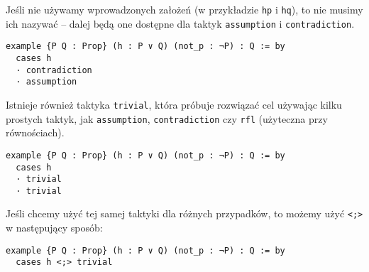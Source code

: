\documentclass[polish,pretty]{angav}
\newcommand{\Lean}[1]{\texttt{#1}}
\begin{document}
Jeśli nie używamy wprowadzonych założeń (w przykładzie \Lean{hp} i \Lean{hq}), to nie musimy ich nazywać -- dalej będą one dostępne dla taktyk \Lean{assumption} i \Lean{contradiction}.
\begin{verbatim}
example {P Q : Prop} (h : P ∨ Q) (not_p : ¬P) : Q := by
  cases h
  · contradiction
  · assumption
\end{verbatim}

Istnieje również taktyka \Lean{trivial}, która próbuje rozwiązać cel używając kilku prostych taktyk, jak \Lean{assumption}, \Lean{contradiction} czy \Lean{rfl} (użyteczna przy równościach).
\begin{verbatim}
example {P Q : Prop} (h : P ∨ Q) (not_p : ¬P) : Q := by
  cases h
  · trivial
  · trivial
\end{verbatim}

Jeśli chcemy użyć tej samej taktyki dla różnych przypadków, to możemy użyć \Lean{<;>} w następujący sposób:
\begin{verbatim}
example {P Q : Prop} (h : P ∨ Q) (not_p : ¬P) : Q := by
  cases h <;> trivial
\end{verbatim}
\end{document}
